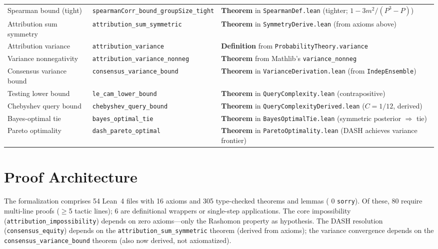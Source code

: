 \documentclass{article}
\begin{document}
\begin{table}[htbp]
\begin{tabular}{@{}p{2.5cm}>{\raggedright\sloppy\arraybackslash}p{4.2cm}>{\raggedright\sloppy\arraybackslash}p{4.8cm}@{}}
Spearman bound (tight) & \texttt{spearmanCorr\_}\allowbreak\texttt{bound\_}\allowbreak\texttt{groupSize\_tight} & \textbf{Theorem} in \texttt{SpearmanDef.lean} (tighter; $1-3m^2/(P^3{-}P)$) \\
Attribution sum symmetry & \texttt{attribution\_\allowbreak sum\_symmetric} & \textbf{Theorem} in \texttt{Symmetry\-Derive.lean} (from axioms above) \\
Attribution variance & \texttt{attribution\_\allowbreak variance} & \textbf{Definition} from \texttt{Probability\-Theory.variance} \\
Variance nonnegativity & \texttt{attribution\_\allowbreak variance\_nonneg} & \textbf{Theorem} from Mathlib's \texttt{variance\_nonneg} \\
Consensus variance bound & \texttt{consensus\_\allowbreak variance\_bound} & \textbf{Theorem} in \texttt{Variance\-Derivation.lean} (from \texttt{IndepEnsemble}) \\
Testing lower bound & \texttt{le\_cam\_\allowbreak lower\_bound} & \textbf{Theorem} in \texttt{Query\-Complexity.lean} (contrapositive) \\
Chebyshev query bound & \texttt{chebyshev\_\allowbreak query\_bound} & \textbf{Theorem} in \texttt{QueryComplexity\-Derived.lean} ($C=1/12$, derived) \\
Bayes-optimal tie & \texttt{bayes\_optimal\_\allowbreak tie} & \textbf{Theorem} in \texttt{Bayes\-OptimalTie.lean} (symmetric posterior $\Rightarrow$ tie) \\
Pareto optimality & \texttt{dash\_pareto\_\allowbreak optimal} & \textbf{Theorem} in \texttt{Pareto\-Optimality.lean} (DASH achieves variance frontier) \\
\bottomrule
\end{tabular}
\end{table}

\section{Proof Architecture}

The formalization comprises 54 Lean~4 files with 16 axioms and
305 type-checked theorems and lemmas (
0 \texttt{sorry}). Of these, 80 require multi-line proofs
($\geq$5 tactic lines); 6 are definitional wrappers or
single-step applications.
The core impossibility (\texttt{attribution\_impossibility}) depends on
zero axioms---only the Rashomon property as hypothesis.
The DASH resolution (\texttt{consensus\_equity}) depends on the
\texttt{attribution\_sum\_symmetric} theorem (derived from axioms);
the variance convergence depends on the \texttt{consensus\_variance\_bound}
theorem (also now derived, not axiomatized).
\end{document}
